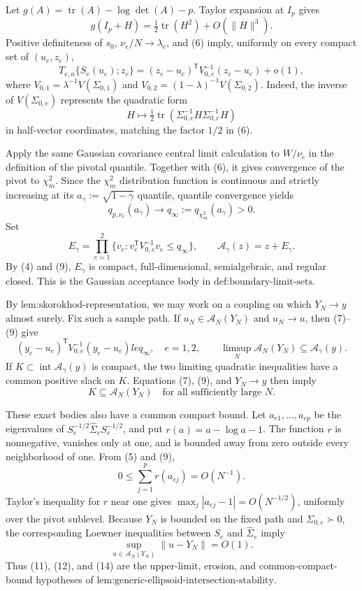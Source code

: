 Let \(g(A)=\operatorname{tr}(A)-\log\det(A)-p\).  Taylor expansion at \(I_p\) gives
\[
 g(I_p+H)=\tfrac12\operatorname{tr}(H^2)+O(\|H\|^3).
 \tag{6}
\]
Positive definiteness of \(s_0\), \(\nu_e/N\to\lambda_e\), and (6) imply, uniformly on every compact set of \((u_e,z_e)\),
\[
 T_{e,n}\{S_e(u_e);z_e\}
 =(z_e-u_e)^{\mathsf T}V_{0,e}^{-1}(z_e-u_e)+o(1),
 \tag{7}
\]
where \(V_{0,1}=\lambda^{-1}V(\Sigma_{0,1})\) and \(V_{0,2}=(1-\lambda)^{-1}V(\Sigma_{0,2})\).  Indeed, the inverse of \(V(\Sigma_{0,e})\) represents the quadratic form
\[
 H\longmapsto\tfrac12
 \operatorname{tr}(\Sigma_{0,e}^{-1}H\Sigma_{0,e}^{-1}H)
 \tag{8}
\]
in half-vector coordinates, matching the factor \(1/2\) in (6).

Apply the same Gaussian covariance central limit calculation to \(W/\nu_e\) in the definition of the pivotal quantile.  Together with (6), it gives convergence of the pivot to \(\chi_m^2\).  Since the \(\chi_m^2\) distribution function is continuous and strictly increasing at its \(a_\gamma:=\sqrt{1-\gamma}\) quantile, quantile convergence yields
\[
 q_{p,\nu_e}(a_\gamma)\longrightarrow
 q_\infty:=q_{\chi_m^2}(a_\gamma)>0.
 \tag{9}
\]
Set
\[
 E_\gamma=\prod_{e=1}^2
 \{v_e:v_e^{\mathsf T}V_{0,e}^{-1}v_e\le q_\infty\},
 \qquad
 \mathcal A_\gamma(z)=z+E_\gamma.
 \tag{10}
\]
By (4) and (9), \(E_\gamma\) is compact, full-dimensional, semialgebraic, and regular closed.  This is the Gaussian acceptance body in \(\text{def:boundary-limit-sets}\).

By \(\text{lem:skorokhod-representation}\), we may work on a coupling on which \(Y_N\to y\) almost surely.  Fix such a sample path.  If \(u_N\in\mathcal A_N(Y_N)\) and \(u_N\to u\), then (7)--(9) give
\[
 (y_e-u_e)^{\mathsf T}V_{0,e}^{-1}(y_e-u_e)le q_\infty,
 \quad e=1,2,
 \qquad
 \limsup_N\mathcal A_N(Y_N)\subseteq\mathcal A_\gamma(y).
 \tag{11}
\]
If \(K\subset\operatorname{int}\mathcal A_\gamma(y)\) is compact, the two limiting quadratic inequalities have a common positive slack on \(K\).  Equations (7), (9), and \(Y_N\to y\) then imply
\[
 K\subseteq\mathcal A_N(Y_N)
 \quad\text{for all sufficiently large }N.
 \tag{12}
\]

These exact bodies also have a common compact bound.  Let \(a_{e1},\ldots,a_{ep}\) be the eigenvalues of \(S_e^{-1/2}\widehat\Sigma_eS_e^{-1/2}\), and put \(r(a)=a-\log a-1\).  The function \(r\) is nonnegative, vanishes only at one, and is bounded away from zero outside every neighborhood of one.  From (5) and (9),
\[
 0\le\sum_{j=1}^p r(a_{ej})=O(N^{-1}).
 \tag{13}
\]
Taylor's inequality for \(r\) near one gives \(\max_j|a_{ej}-1|=O(N^{-1/2})\), uniformly over the pivot sublevel.  Because \(Y_N\) is bounded on the fixed path and \(\Sigma_{0,e}\succ0\), the corresponding Loewner inequalities between \(S_e\) and \(\widehat\Sigma_e\) imply
\[
 \sup_{u\in\mathcal A_N(Y_N)}\|u-Y_N\|=O(1).
 \tag{14}
\]
Thus (11), (12), and (14) are the upper-limit, erosion, and common-compact-bound hypotheses of \(\text{lem:generic-ellipsoid-intersection-stability}\).

